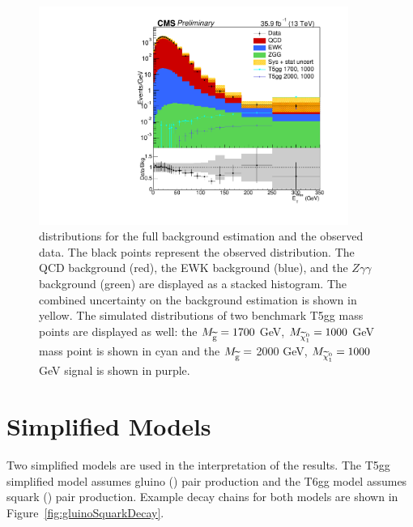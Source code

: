 \begin{figure}[h]
\begin{center}
\includegraphics[width=0.9\textwidth]{Figures/Results/finalPlot.pdf}
\end{center}
\caption[\ETmiss distributions for the full background estimation and the observed data.]
{\ETmiss distributions for the full background estimation and the observed data. 
	The black points represent the observed \ETmiss distribution. 
	The QCD background (red), the EWK background
	(blue), and the $Z\gamma\gamma$ background (green) are displayed as a stacked histogram. 
	The combined uncertainty on the background estimation is shown in yellow.
	The simulated \ETmiss distributions of two benchmark T5gg mass points are displayed as well:
	the $M_{\widetilde{\mathrm{g}}} = 1700$ GeV, $M_{\widetilde{\chi}^{0}_{1}} = 1000$ GeV mass point is shown in cyan and the
	 $M_{\widetilde{\mathrm{g}} }=$ 2000 GeV, $M_{\widetilde{\chi}^{0}_{1}} = 1000$ GeV signal is shown in purple.}
\label{fig:FinalPlot}
\end{figure}


\section{Simplified Models}
\label{sec:SimplifiedModels}

Two simplified models are used in the interpretation of the results. The T5gg simplified model assumes gluino (\gluino) pair production and the T6gg model assumes squark (\squark) pair production. Example decay chains for both models are shown in Figure~\ref{fig:gluinoSquarkDecay}.


